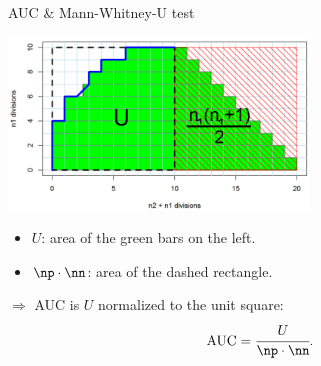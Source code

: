 \documentclass[11pt,compress,t,notes=noshow, xcolor=table]{beamer}
\begin{document}
\begin{vbframe}{AUC \& Mann-Whitney-U test}
\framebreak

\begin{center}
  \includegraphics[width=0.6\textwidth]{figure_man/roc-mannwhitney2.png}
\end{center}

\begin{itemize}
  \item $U$: area of the green bars on the left.
  \item $\np \cdot \nn$: area of the dashed rectangle.
\end{itemize}

\vfill
 
$\Rightarrow$ AUC is $U$ normalized to the unit square: \\
$$\text{AUC} = \cfrac{U}{\np \cdot \nn}.$$

\end{vbframe}


\endlecture
\end{document}
